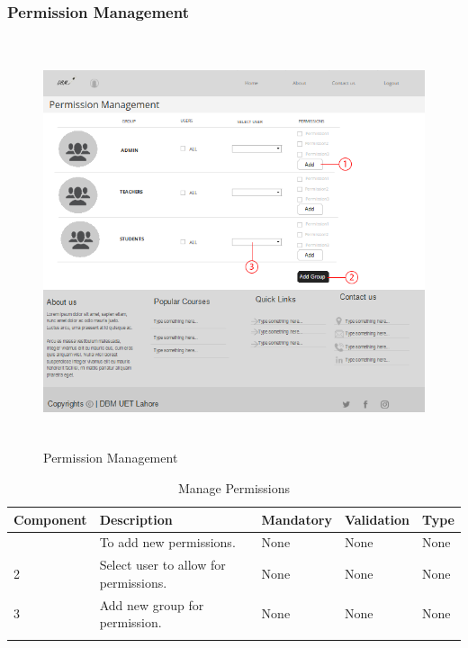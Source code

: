 \documentclass[12pt]{article}
\begin{document}
\subsubsection{Permission Management}
\begin{figure}[h]
  \centering
  \includegraphics[width=12cm, height=12cm]{PermissionManagement(Admin)}
  \caption{Permission Management}
\end{figure}
\begin{longtable}{|>{\raggedright\arraybackslash}p{2.5cm}|>{\raggedright\arraybackslash}p{4cm}|>{\raggedright\arraybackslash}p{2.2cm}|>{\raggedright\arraybackslash}p{2cm}|>{\raggedright\arraybackslash}p{2cm}|}
\hline
\textbf{Component} & \textbf{Description} & \textbf{Mandatory} & \textbf{Validation} & \textbf{Type}\\
\hline
1 &
To add new permissions. &
None &
None &
None \\
\hline

2 &
Select user to allow for permissions. &
None &
None &
None \\
\hline

3 &
Add new group for permission. &
None &
None &
None \\
\hline

\caption{Manage Permissions}
\end{longtable}

\newpage
\end{document}
